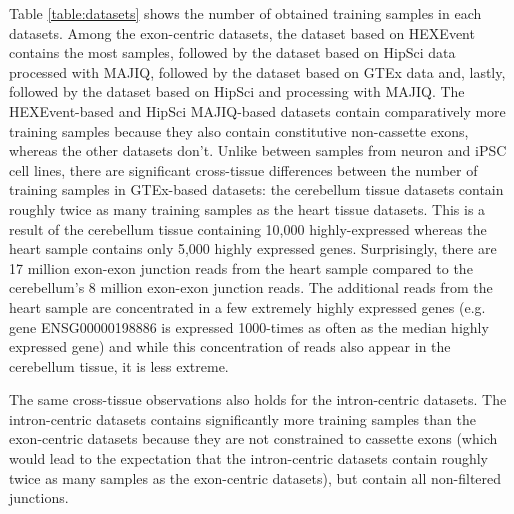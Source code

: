 Table \ref{table:datasets} shows the number of obtained training samples in each datasets. Among the exon-centric datasets, the dataset based on HEXEvent contains the most samples, followed by the dataset based on HipSci data processed with MAJIQ, followed by the dataset based on GTEx data and, lastly, followed by the dataset based on HipSci and processing with MAJIQ. The HEXEvent-based and HipSci MAJIQ-based datasets contain comparatively more training samples because they also contain constitutive non-cassette exons, whereas the other datasets don't. Unlike between samples from neuron and iPSC cell lines, there are significant cross-tissue differences between the number of training samples in GTEx-based datasets: the cerebellum tissue datasets contain roughly twice as many training samples as the heart tissue datasets. This is a result of the cerebellum tissue containing 10,000 highly-expressed whereas the heart sample contains only 5,000 highly expressed genes. Surprisingly, there are 17 million exon-exon junction reads from the heart sample compared to the cerebellum's 8 million exon-exon junction reads. The additional reads from the heart sample are concentrated in a few extremely highly expressed genes (e.g. gene ENSG00000198886 is expressed 1000-times as often as the median highly expressed gene) and while this concentration of reads also appear in the cerebellum tissue, it is less extreme.

The same cross-tissue observations also holds for the intron-centric datasets. The intron-centric datasets contains significantly more training samples than the exon-centric datasets because they are not constrained to cassette exons (which would lead to the expectation that the intron-centric datasets contain roughly twice as many samples as the exon-centric datasets), but contain all non-filtered junctions. 
%

